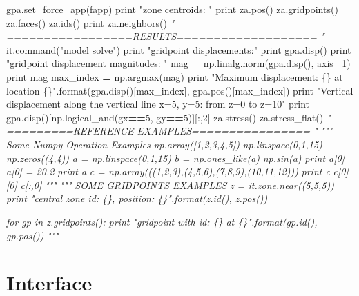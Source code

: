 \documentclass[a4paper, nobind]{templates/ociamthesis}
\newenvironment{Shaded}{\begin{snugshade}}{\end{snugshade}}
\newcommand{\BuiltInTok}[1]{#1}
\newcommand{\CommentTok}[1]{\textcolor[rgb]{0.56,0.35,0.01}{\textit{#1}}}
\newcommand{\DecValTok}[1]{\textcolor[rgb]{0.00,0.00,0.81}{#1}}
\newcommand{\NormalTok}[1]{#1}
\newcommand{\OperatorTok}[1]{\textcolor[rgb]{0.81,0.36,0.00}{\textbf{#1}}}
\newcommand{\SpecialCharTok}[1]{\textcolor[rgb]{0.00,0.00,0.00}{#1}}
\newcommand{\StringTok}[1]{\textcolor[rgb]{0.31,0.60,0.02}{#1}}
\renewenvironment{Shaded}
{
  \vspace{10pt}%
  \begin{snugshade}%
}{%
  \end{snugshade}%
  \vspace{8pt}%
}
\begin{document}
\begin{Shaded}
\begin{Highlighting}[]
\NormalTok{gpa.set\_force\_app(fapp)}
\BuiltInTok{print} \StringTok{"zone centroids: "}
\BuiltInTok{print}\NormalTok{ za.pos()}
\NormalTok{za.gridpoints()}
\NormalTok{za.faces()}
\NormalTok{za.ids()}
\BuiltInTok{print}\NormalTok{ za.neighbors()}
\CommentTok{" =================RESULTS=================== "}
\NormalTok{it.command(}\StringTok{"model solve"}\NormalTok{)}
\BuiltInTok{print} \StringTok{"gridpoint displacements:"}
\BuiltInTok{print}\NormalTok{ gpa.disp()}
\BuiltInTok{print} \StringTok{"gridpoint displacement magnitudes: "}
\NormalTok{mag }\OperatorTok{=}\NormalTok{ np.linalg.norm(gpa.disp(), axis}\OperatorTok{=}\DecValTok{1}\NormalTok{)}
\BuiltInTok{print}\NormalTok{ mag}
\NormalTok{max\_index }\OperatorTok{=}\NormalTok{ np.argmax(mag)}
\BuiltInTok{print} \StringTok{"Maximum displacement: }\SpecialCharTok{\{\}}\StringTok{ at location }\SpecialCharTok{\{\}}\StringTok{"}\NormalTok{.}\BuiltInTok{format}\NormalTok{(gpa.disp()[max\_index],}
\NormalTok{                                              gpa.pos()[max\_index])}
\BuiltInTok{print} \StringTok{"Vertical displacement along the vertical line x=5, y=5: from z=0 to z=10"}
\BuiltInTok{print}\NormalTok{ gpa.disp()[np.logical\_and(gx}\OperatorTok{==}\DecValTok{5}\NormalTok{, gy}\OperatorTok{==}\DecValTok{5}\NormalTok{)][:,}\DecValTok{2}\NormalTok{]}
\NormalTok{za.stress()}
\NormalTok{za.stress\_flat()}
\CommentTok{" =========REFERENCE EXAMPLES================ "}
\CommentTok{""" Some Numpy Operation Examples}
\CommentTok{np.array([1,2,3,4,5])}
\CommentTok{np.linspace(0,1,15)}
\CommentTok{np.zeros((4,4))}
\CommentTok{a = np.linspace(0,1,15)}
\CommentTok{b = np.ones\_like(a)}
\CommentTok{np.sin(a)}
\CommentTok{print a[0]}
\CommentTok{a[0] = 20.2}
\CommentTok{print a}
\CommentTok{c = np.array(((1,2,3),(4,5,6),(7,8,9),(10,11,12)))}
\CommentTok{print c}
\CommentTok{c[0][0]}
\CommentTok{c[:,0]}
\CommentTok{"""}
\CommentTok{""" SOME GRIDPOINTS EXAMPLES}
\CommentTok{z = it.zone.near((5,5,5))}
\CommentTok{print "central zone id: \{\}, position: \{\}".format(z.id(), z.pos())}

\CommentTok{for gp in z.gridpoints():}
\CommentTok{    print "gridpoint with id: \{\} at \{\}".format(gp.id(), gp.pos())}
\CommentTok{"""}
\end{Highlighting}
\end{Shaded}

\hypertarget{interface-3}{%
\section{Interface}\label{interface-3}}
\end{document}
